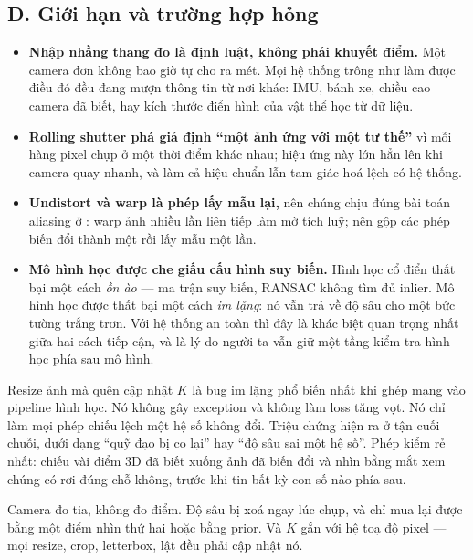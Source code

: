 \documentclass[../../../deep_learning.tex]{subfiles}
\begin{document}
\subsection{D. Giới hạn và trường hợp hỏng}
\begin{itemize}
\item \textbf{Nhập nhằng thang đo là định luật, không phải khuyết điểm.} Một camera đơn không bao giờ tự cho ra mét. Mọi hệ thống trông như làm được điều đó đều đang mượn thông tin từ nơi khác: IMU, bánh xe, chiều cao camera đã biết, hay kích thước điển hình của vật thể học từ dữ liệu.
\item \textbf{Rolling shutter phá giả định ``một ảnh ứng với một tư thế''} vì mỗi hàng pixel chụp ở một thời điểm khác nhau; hiệu ứng này lớn hẳn lên khi camera quay nhanh, và làm cả hiệu chuẩn lẫn tam giác hoá lệch có hệ thống.
\item \textbf{Undistort và warp là phép lấy mẫu lại,} nên chúng chịu đúng bài toán aliasing ở : warp ảnh nhiều lần liên tiếp làm mờ tích luỹ; nên gộp các phép biến đổi thành một rồi lấy mẫu một lần.
\item \textbf{Mô hình học được che giấu cấu hình suy biến.} Hình học cổ điển thất bại một cách \emph{ồn ào} --- ma trận suy biến, RANSAC không tìm đủ inlier. Mô hình học được thất bại một cách \emph{im lặng}: nó vẫn trả về độ sâu cho một bức tường trắng trơn. Với hệ thống an toàn thì đây là khác biệt quan trọng nhất giữa hai cách tiếp cận, và là lý do người ta vẫn giữ một tầng kiểm tra hình học phía sau mô hình.

\end{itemize}

\begin{cambay}
Resize ảnh mà quên cập nhật \(K\) là bug im lặng phổ biến nhất khi ghép mạng vào pipeline hình học. Nó không gây exception và không làm loss tăng vọt. Nó chỉ làm mọi phép chiếu lệch một hệ số không đổi. Triệu chứng hiện ra ở tận cuối chuỗi, dưới dạng ``quỹ đạo bị co lại'' hay ``độ sâu sai một hệ số''. Phép kiểm rẻ nhất: chiếu vài điểm 3D đã biết xuống ảnh đã biến đổi và nhìn bằng mắt xem chúng có rơi đúng chỗ không, trước khi tin bất kỳ con số nào phía sau.
\end{cambay}

\begin{cannho}
Camera đo tia, không đo điểm. Độ sâu bị xoá ngay lúc chụp, và chỉ mua lại được bằng một điểm nhìn thứ hai hoặc bằng prior. Và \(K\) gắn với hệ toạ độ pixel --- mọi resize, crop, letterbox, lật đều phải cập nhật nó. 
\end{cannho}
\end{document}
